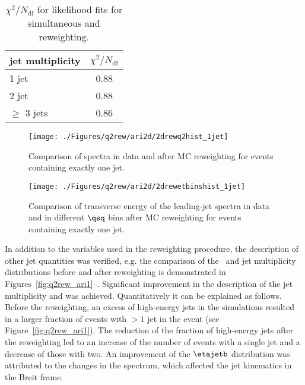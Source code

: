 \begin{table}%
\begin{center}
\begin{tabular}{l|c}
jet multiplicity & $\chi^2/N_\text{df}$ \\
\hline
1 jet & 0.88 \\
2 jet & 0.88 \\
$\geq$ 3 jets & 0.86 \\
\end{tabular}
\end{center}
\caption{$\chi^2/N_\text{df}$ for likelihood fits for simultaneous \qsq and \etjetb reweighting.}
\label{tab:chi2q2ariadnerew}
\end{table}

\begin{figure}[t!]%
\centering
\texttt{[image: ./Figures/q2rew/ari2d/2drewq2hist\_1jet]}%
\caption{Comparison of \qsq spectra in data and \ariadne after MC reweighting for events containing exactly one jet.}%
\label{fig:2dq2rew_q2_1jet}%
\end{figure}

\begin{figure}[p]%
\centering
\texttt{[image: ./Figures/q2rew/ari2d/2drewetbinshist\_1jet]}%
\caption{Comparison of transverse energy of the leading-jet spectra in data and \ariadne in different $\qsq$ bins after MC reweighting for events containing exactly one jet.}%
\label{fig:2dq2rew_et_1jet}%
\end{figure}

In addition to the variables used in the reweighting procedure, the description of other jet quantities was verified, e.g. the comparison of the \etajetb~and jet multiplicity distributions before and after reweighting is demonstrated in Figures~\ref{fig:q2rew_ari1}--. Significant improvement in the description of the jet multiplicity and \etajetb was achieved. Quantitatively it can be explained as follows. Before the reweighting, an excess of high-energy jets in the simulations resulted in a larger fraction of events with $> 1$ jet in the event (see Figure~\ref{fig:q2rew_ari1}). The reduction of the fraction of high-energy jets after the reweighting led to an increase of the number of events with a single jet and a decrease of those with two. An improvement of the $\etajetb$ distribution was attributed to the changes in the \qsq spectrum, which affected the jet kinematics in the Breit frame.

